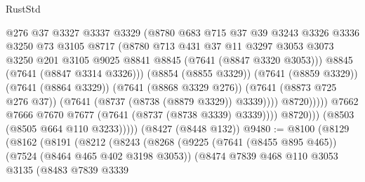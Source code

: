 \begin{lexlean}{RustStd}
\begin{coremodule}
{\begin{coremodule}
{{{{{{{{{{{{{{{{{{{{{{{{{{{{{{{{                                  @276
                                  @37
                                  @3327
                                  @3337
                                  @3329
                                  (@8780
                                    @683
                                    @715
                                    @37
                                    @39
                                    @3243
                                    @3326
                                    @3336
                                    @3250
                                    @73
                                    @3105
                                    @8717
                                    (@8780
                                      @713
                                      @431
                                      @37
                                      @11
                                      @3297
                                      @3053
                                      @3073
                                      @3250
                                      @201
                                      @3105
                                      @9025
                                      @8841
                                      @8845
                                      (@7641 (@8847 @3320 @3053)))
                                    @8845
                                    (@7641 (@8847 @3314 @3326)))
                                  (@8854 (@8855 @3329))
                                  (@7641 (@8859 @3329))
                                  (@7641 (@8864 @3329))
                                  (@7641 (@8868 @3329 @276))
                                  (@7641 (@8873 @725 @276 @37))
                                  (@7641 (@8737 (@8738 (@8879 @3329)) @3339))))
                              @8720)))))
                    @7662
                    @7666
                    @7670
                    @7677
                    (@7641 (@8737 (@8738 @3339) @3339))))
                @8720)))
          (@8503 (@8505 @664 @110 @3233)))))
    (@8427 (@8448 @132))
@9480 := @8100
    (@8129
      (@8162
        (@8191
          (@8212
            (@8243
              (@8268
                (@9225
                  (@7641 (@8455 @895 @465))
                  (@7524 (@8464 @465 @402 @3198 @3053))
                  (@8474
                    @7839
                    @468
                    @110
                    @3053
                    @3135
                    (@8483
                      @7839
                      @3339
}}}}}}}}}}}}}}}}}}}}}}}}}}}}}}}}
\end{coremodule}}
\end{coremodule}
\end{lexlean}
